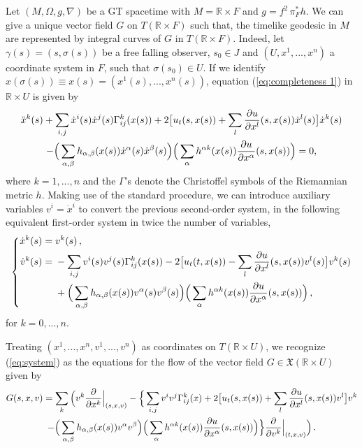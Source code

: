 \documentclass[12pt]{article}
\newcommand{\mfrac}[2]{\mbox{\footnotesize$\displaystyle\frac{#1}{#2}$}}
\newcommand{\spacetime}{(M,\Omega,g,\nabla)}
\def\R{\mathbb R}
\begin{document}
Let $\spacetime$ be a GT spacetime with $M=\R\times F$ and $g=f^2 \, \pi_F^* h$. We can give a unique vector field $G$ on $T(\R\times F)$ such that, the timelike geodesic in $M$ are represented by integral curves of $G$ in $T(\R\times F)$. Indeed, let $\gamma(s)=(s,\sigma (s))$ be a free falling observer, $s_0\in J$ and $(U,x^1,...,x^n)$ a coordinate system in $F$, such that $\sigma(s_0)\in U$. If we identify $x(\sigma(s))\equiv x(s)=(x^1(s),...,x^n(s))$, equation (\ref{eq:completeness 1}) in $\R\times U$ is given by
\begin{multline}
\ddot{x}^k(s)+\sum_{i,j} \dot{x}^i(s)\dot{x}^j(s)\Gamma_{ij}^k(x(s))+2\big[u_t(s, x(s))
+\sum_l \mfrac{\partial u}{\partial x^l}(s, x(s))\dot{x}^l(s)\big]\dot{x}^k(s)\\
-\Big(\sum_{\alpha,\beta}h_{\alpha,\beta}(x(s))\dot{x}^\alpha(s)\dot{x}^\beta(s)\Big)\Big(\sum_\alpha h^{\alpha k}(x(s))\mfrac{\partial u}{\partial x^\alpha}(s, x(s))\Big)=0,
\end{multline}
where $k=1,...,n$ and the $\Gamma$'s denote the Christoffel symbols of the Riemannian metric $h$. Making use of the standard procedure, we can introduce auxiliary variables $v^i=\dot{x}^i$ to convert the previous second-order system, in the following equivalent first-order system in twice the number of variables,
\begin{equation}\label{eq:system}
\left\{
\begin{aligned}
\dot{x}^k(s)={}& v^k(s)\,,\\
\dot{v}^k(s)={}& -\sum_{i,j} v^i(s)v^j(s)\Gamma_{ij}^k(x(s))-2\big[u_t(t, x(s))
-\sum_l \mfrac{\partial u}{\partial x^l}(s, x(s))v^l(s)\big]v^k(s) \\
{}& + \Big(\sum_{\alpha,\beta}h_{\alpha,\beta}(x(s))v^\alpha(s)v^\beta(s)\Big)\Big(\sum_\alpha h^{\alpha k}(x(s))\mfrac{\partial u}{\partial x^\alpha}(s, x(s))\Big)\,,
\end{aligned}
\right.
\end{equation}
for $k=0,...,n$.

Treating $(x^1,...,x^n,v^1,...,v^n)$ as	coordinates on $T(\R\times U)$, we recognize  (\ref{eq:system}) as the equations for the flow of the vector field $G \in\mathfrak{X}(\R\times U)$ given by
\begin{multline}
G{(s,x,v)}=\sum_{k}\Big(v^k \mfrac{\partial}{\partial x^k}{\Big|_{(s,x,v)}}-\Big\lbrace\sum_{i,j} v^iv^j\Gamma_{ij}^k(x)+2\big[u_t(s, x(s)) + \sum_l \mfrac{\partial u}{\partial x^l}(s, x(s))v^l\big]v^k\\
-\Big(\sum_{\alpha,\beta}h_{\alpha,\beta}(x(s))v^\alpha v^\beta\Big)\Big(\sum_\alpha h^{\alpha k}(x(s))\mfrac{\partial u}{\partial x^\alpha}(s, x(s))\Big)\Big\rbrace \mfrac{\partial}{\partial v^k}{\Big|_{(t,x,v)}}\Big)\,.
\end{multline}
\end{document}
